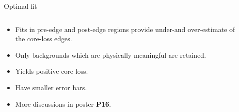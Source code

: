 \documentclass[aspectratio=169]{beamer}
\begin{document}
\begin{frame}{Optimal fit}

\begin{columns}[t]
	\begin{column}{.6\textwidth}
		\begin{itemize}
			\item Fits in pre-edge and post-edge regions provide under-and over-estimate of the core-loss edges.
			\item Only backgrounds which are physically meaningful are retained.
			\item Yields positive core-loss.
			\item Have smaller error bars.
			\item More discussions in poster \textbf{\LARGE{\alert{P16}}}.
		\end{itemize}
	\end{column}

	\begin{column}{.4\textwidth}
		\vspace{0.1cm}
	\end{column}
\end{columns}

\end{frame}



%  
\end{document}
